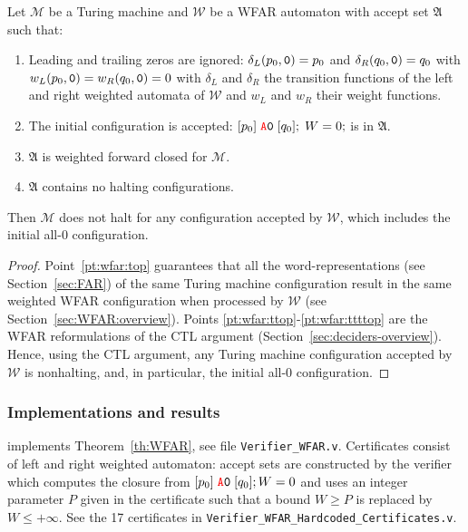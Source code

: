 \begin{theorem}\label{th:WFAR}
    Let $\mathcal{M}$ be a Turing machine and $\mathcal{W}$ be a WFAR automaton with accept set $\mathfrak{A}$ such that:
    \begin{enumerate}
        \item Leading and trailing zeros are ignored: $\delta_L(p_0,\texttt{0}) = p_0$ and $\delta_R(q_0,\texttt{0}) = q_0$ with $w_L(p_0,\texttt{0}) = w_R(q_0,\texttt{0}) = 0$ with $\delta_L$ and $\delta_R$ the transition functions of the left and right weighted automata of $\mathcal{W}$ and $w_L$ and $w_R$ their weight functions.\label{pt:wfar:top}
        \item The initial configuration is accepted: \ie $[p_0]\; \texttt{\stateA}\szero\; [q_0];\; W=0;$ is in $\mathfrak{A}$.\label{pt:wfar:ttop}
        \item $\mathfrak{A}$ is weighted forward closed for $\mathcal{M}$.\label{pt:wfar:tttop}
        \item $\mathfrak{A}$ contains no halting configurations.\label{pt:wfar:ttttop}
    \end{enumerate}

    Then $\mathcal{M}$ does not halt for any configuration accepted by $\mathcal{W}$, which includes the initial all-0 configuration.
\end{theorem}
\begin{proof}
    Point~\ref{pt:wfar:top} guarantees that all the word-representations (see Section~\ref{sec:FAR}) of the same Turing machine configuration result in the same weighted WFAR configuration when processed by $\mathcal{W}$ (see Section~\ref{sec:WFAR:overview}). Points \ref{pt:wfar:ttop}-\ref{pt:wfar:ttttop} are the WFAR reformulations of the CTL argument (Section~\ref{sec:deciders-overview}). Hence, using the CTL argument, any Turing machine configuration accepted by $\mathcal{W}$ is nonhalting, and, in particular, the initial all-0 configuration.
\end{proof}





\subsubsection{Implementations and results}\label{sec:WFAR:results}

\CoqBB implements Theorem~\ref{th:WFAR}, see file \texttt{Verifier\_WFAR.v}. Certificates consist of left and right weighted automaton: accept sets are constructed by the \Coq verifier which computes the closure from $[p_0]\; \texttt{\stateA} \szero\; [q_0]; W=0$ and uses an integer parameter $P$ given in the certificate such that a bound $W \geq P$ is replaced by $W \leq +\infty$. See the 17 certificates in \texttt{Verifier\_WFAR\_Hardcoded\_Certificates.v}.

